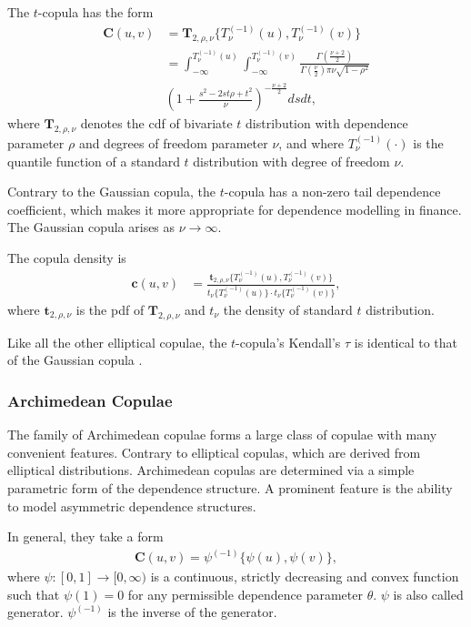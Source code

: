 The $t$-copula has the form
\begin{align*}
        \bm{C}(u,v) &= \bm{T}_{2, \rho, \nu}\{T^{(-1)}_\nu(u), T^{(-1)}_\nu(v)\} \nonumber \\[10pt]
            &= \int_{-\infty}^{T^{(-1)}_\nu(u)}
               \int_{-\infty}^{T^{(-1)}_\nu(v)}
            \frac{\Gamma\left(\frac{\nu+2}{2}\right)}
            {\Gamma\left(\frac{\nu}{2}\right)\pi\nu\sqrt{1-\rho^2}}\\[10pt]
           & \left(
        1+\frac{s^2-2st\rho+t^2}{\nu}
        \right)^{-\frac{\nu+2}{2}} ds dt,
    \end{align*}
where $\bm{T}_{2, \rho, \nu}$ denotes the cdf of
bivariate $t$ distribution with dependence parameter $\rho$ and degrees of freedom parameter $\nu$,
and where $T^{(-1)}_\nu(\cdot)$ is the quantile function of a standard
$t$ distribution with degree of freedom $\nu$. \medskip

Contrary to the Gaussian copula, the $t$-copula has a non-zero
tail dependence coefficient, which makes it more appropriate for
dependence modelling in finance. The Gaussian copula arises as
$\nu\rightarrow\infty$.

The copula density is
\begin{align*}
    \bm{c}(u,v) &= \frac{\bm{t}_{2, \rho, \nu}\{T^{(-1)}_\nu(u), T^{(-1)}_\nu(v)\}}
    {t_\nu\{T^{(-1)}_\nu(u)\}\cdot t_\nu\{T^{(-1)}_\nu(v)\}},
    \end{align*}
where $\bm{t}_{2,\rho, \nu}$ is the pdf of $\bm{T}_{2, \rho, \nu}$
and $t_\nu$ the density of standard $t$ distribution.\medskip

Like all the other elliptical copulae, the $t$-copula's Kendall's
$\tau$ is identical to that of the Gaussian copula \citep[see][and
references therein]{demarta2005t}. 


\subsubsection{Archimedean Copulae}\label{sec:archimedean-copula}
The family of Archimedean copulae forms a large class of copulae with
many convenient features.
Contrary to elliptical copulas, which are derived from
elliptical distributions.
Archimedean copulas are determined via a simple parametric form of the dependence structure.
A prominent feature is the ability to model asymmetric dependence structures. \medskip

In general, they take a form
\begin{align*}
    \bm{C}(u,v)= \psi^{(-1)}\{\psi(u), \psi(v)\},
    \end{align*}
where $\psi:[0,1] \rightarrow [0,\infty)$ is a continuous, strictly
decreasing and convex function such that $\psi(1)=0$ for any
permissible dependence parameter $\theta$. $\psi$ is also called
generator. $\psi^{(-1)}$ is the inverse of the generator. \medskip


